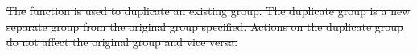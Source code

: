 \documentclass[12pt]{report} %
\providecommand{\DIFdeltex}[1]{{\protect\color{red}\sout{#1}}}                      %
\providecommand{\DIFdel}[1]{\texorpdfstring{\DIFdeltex{#1}}{}} %
\begin{document}

\DIFdel{The }%
\DIFdel{function is used to duplicate an existing group.
The duplicate group is a new separate group from the original group specified.
Actions on the duplicate group do not affect the original group and vice versa.
}%

\end{document}

